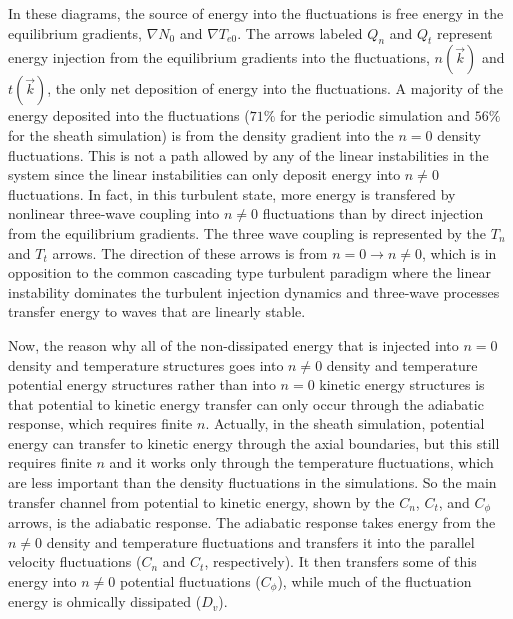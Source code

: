 \documentclass[showpacs,preprintnumbers,amsmath,amssymb,superscriptaddress,aip]{revtex4-1}
\begin{document}
In these diagrams, the source of energy into the fluctuations is free energy in the equilibrium gradients, $\nabla N_0$ and $\nabla T_{e0}$. The arrows labeled $Q_n$ and $Q_t$ represent energy injection from
the equilibrium gradients into the fluctuations, $n(\vec{k})$ and $t(\vec{k})$, the only net deposition of energy into the fluctuations. A majority of the energy deposited into the fluctuations ($71\%$
for the periodic simulation and $56\%$ for the sheath simulation)
is from the density gradient into the $n=0$ density fluctuations. This is not a path allowed by any of the linear instabilities in the system since
the linear instabilities can only deposit energy into $n \ne 0$ fluctuations.
In fact, in this turbulent state, more energy is transfered by nonlinear three-wave coupling into $n \ne 0$ fluctuations than by direct injection from the equilibrium gradients. The three wave
coupling is represented by the $T_n$ and $T_t$ arrows. The direction of these arrows is from $n=0 \rightarrow n \ne 0$, which is in opposition to the common cascading type 
turbulent paradigm where the linear instability dominates the turbulent injection dynamics and three-wave processes transfer energy to waves that are linearly stable.

Now, the reason why all of the non-dissipated energy that is injected into $n=0$ density and temperature structures goes into $n \ne 0$ density and temperature potential energy structures rather than into $n=0$
kinetic energy structures is that potential to kinetic energy transfer can only occur through the adiabatic response, which requires finite $n$. Actually, in the sheath simulation, potential energy
can transfer to kinetic energy through the axial boundaries, but this still requires finite $n$ and it works only through the temperature fluctuations, which are less important than the density
fluctuations in the simulations. So the main transfer channel from potential to kinetic energy, shown by the $C_n$, $C_t$, and $C_\phi$ arrows, is the adiabatic response. The adiabatic response takes energy
from the $n \ne 0$ density and temperature fluctuations and transfers it into the parallel velocity fluctuations ($C_n$ and $C_t$, respectively). It then transfers some of this energy into
$n \ne 0$ potential fluctuations ($C_\phi$), while much of the fluctuation energy is ohmically dissipated ($D_v$).
\end{document}
